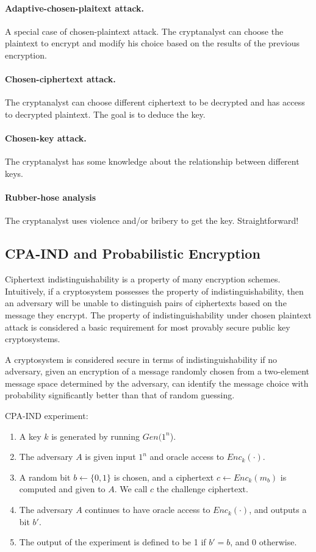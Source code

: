 \documentclass{article}
\theoremstyle{mytheoremstyle}
\begin{document}
    \paragraph{Adaptive-chosen-plaitext attack.}
    A special case of chosen-plaintext attack. The cryptanalyst can choose the plaintext to encrypt and modify his choice based on the results of the previous encryption.
    \paragraph{Chosen-ciphertext attack.}
    The cryptanalyst can choose different ciphertext to be decrypted and has access to decrypted plaintext. The goal is to deduce the key.
    \paragraph{Chosen-key attack.}
    The cryptanalyst has some knowledge about the relationship between different keys.
    \paragraph{Rubber-hose analysis}
    The cryptanalyst uses violence and/or bribery to get the key. Straightforward!
    \subsection{CPA-IND and Probabilistic Encryption}
    Ciphertext indistinguishability is a property of many encryption schemes.
    Intuitively, if a cryptosystem possesses the property of indistinguishability, then an adversary will be unable to distinguish pairs of ciphertexts based on the message they encrypt. The property of indistinguishability under chosen plaintext attack is considered a basic requirement for most provably secure public key cryptosystems.

    A cryptosystem is considered secure in terms of indistinguishability if no adversary, given an encryption of a message randomly chosen from a two-element message space determined by the adversary, can identify the message choice with probability significantly better than that of random guessing.

    CPA-IND experiment:
    \begin{enumerate}
        \item A key $k$ is generated by running $Gen(1^n$).
        \item The adversary $A$ is given input $1^n$ and oracle access to $Enc_k(\cdot)$.
        \item A random bit $b\leftarrow\{0,1\}$ is chosen, and a ciphertext $c\leftarrow Enc_k(m_b)$ is computed and given to $A$. We call $c$ the challenge ciphertext.
        \item The adversary $A$ continues to have oracle access to $Enc_k(\cdot)$, and outputs a bit $b'$.
        \item The output of the experiment is defined to be 1 if $b'=b$, and 0 otherwise. 
    \end{enumerate}
\end{document}
